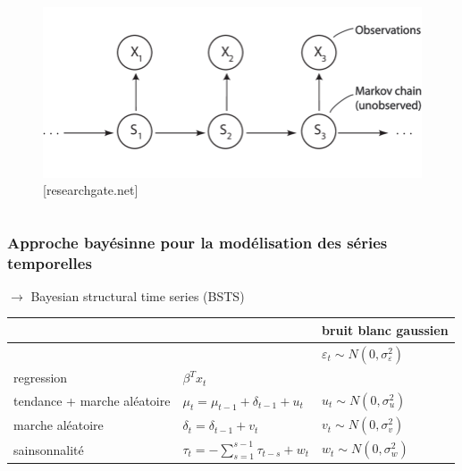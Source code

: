 \begin{frame}
\begin{columns}
        \begin{column}{0.5\textwidth}
            \begin{figure}
                \includegraphics[width=\textwidth]{Figures/hmc.png}
                \caption{[researchgate.net]}
            \end{figure}
        \end{column}
    \end{columns}
\end{frame}

\begin{frame}
    \frametitle{Approche bayésinne pour la modélisation des séries temporelles}
    
    $\rightarrow$ Bayesian structural time series (BSTS) 
    \bgroup
    \def\arraystretch{1.5}
\begin{table}[]
    \begin{tabular}{lll}
        &                                                                         & bruit blanc gaussien       \\ \hline
\rowcolor[HTML]{96FFFB} 
\multicolumn{1}{l|}{\cellcolor[HTML]{96FFFB}{\color[HTML]{333333} observation}} & \multicolumn{1}{l|}{\cellcolor[HTML]{96FFFB}{\color[HTML]{333333} $y_{t}=\mu_{t}+\beta^{T} x_{t}+\tau_t +\varepsilon_{t}$}}  & {\color[HTML]{333333} $\varepsilon_{t} \sim N\left(0, \sigma_{\varepsilon}^{2}\right)$} \\ \hline
\multicolumn{1}{l|}{regression}                                                 & \multicolumn{1}{l|}{${\beta^{T} x_{t}}$}                                 &                      \\ \hline
\multicolumn{1}{l|}{tendance + marche aléatoire}                                & \multicolumn{1}{l|}{${\mu_{t}=\mu_{t-1}+\delta_{t-1}+u_{t}}$}            & $u_{t} \sim N\left(0, \sigma_{u}^{2}\right)$                        \\ \hline
\multicolumn{1}{l|}{marche aléatoire}                                           & \multicolumn{1}{l|}{$\delta_{t}=\delta_{t-1}+v_{t}$}                     & $v_{t} \sim N\left(0, \sigma_{v}^{2}\right)$                        \\ \hline
\multicolumn{1}{l|}{sainsonnalité}                                              & \multicolumn{1}{l|}{$\tau_{t}=-\sum_{s=1}^{s-1} \tau_{t-s}+w_{t}$}       & $w_{t} \sim N\left(0, \sigma_{w}^{2}\right)$                       
\end{tabular}
\end{table}
\egroup
\end{frame}


